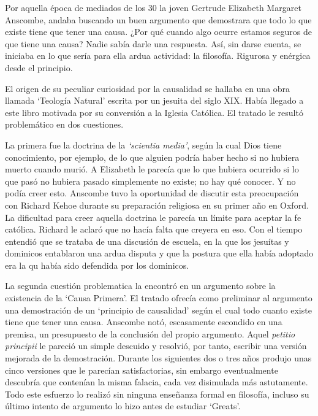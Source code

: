 
Por aquella época de mediados de los 30 la joven Gertrude Elizabeth Margaret Anscombe, andaba buscando un buen argumento que demostrara que todo lo que existe tiene que tener una causa. ¿Por qué cuando algo ocurre estamos seguros de que tiene una causa? Nadie sabía darle una respuesta.\autocite[cf.~][p.~vii ]{anscombe1981metaphysicsintro} Así, sin darse cuenta, se iniciaba en lo que sería para ella ardua actividad: la filosofía. Rigurosa y enérgica desde el principio.

El origen de su peculiar curiosidad por la causalidad se hallaba en una obra llamada `Teología Natural' escrita por un jesuita del siglo XIX. Había llegado a este libro motivada por su conversión a la Iglesia Católica.\autocite[cf.~][p.~vii]{anscombe1981metaphysicsintro} El tratado le resultó problemático en dos cuestiones.

La primera fue la doctrina de la \emph{`scientia media'}, según la cual Dios tiene conocimiento, por ejemplo, de lo que alguien podría haber hecho si no hubiera muerto cuando murió. A Elizabeth le parecía que lo que hubiera ocurrido si lo que pasó no hubiera pasado simplemente no existe; no hay qué conocer. Y no podía creer esto. Anscombe tuvo la oportunidad de discutir esta preocupación con Richard Kehoe durante su preparación religiosa en su primer año en Oxford. La dificultad para creer aquella doctrina le parecía un límite para aceptar la fe católica. Richard le aclaró que no hacía falta que creyera en eso. Con el tiempo entendió que se trataba de una discusión de escuela, en la que los jesuítas y dominicos entablaron una ardua disputa y que la postura que ella había adoptado era la qu había sido defendida por los dominicos.\autocite[cf.~][p.~vii]{anscombe1981metaphysicsintro}

La segunda cuestión problematica la encontró en un argumento sobre la existencia de la `Causa Primera'. El tratado ofrecía como preliminar al argumento una demostración de un `principio de causalidad' según el cual todo cuanto existe tiene que tener una causa. Anscombe notó, escasamente escondido en una premisa, un presupuesto de la conclusión del propio argumento. Aquel \emph{petitio principii} le pareció un simple descuido y resolvió, por tanto, escribir una versión mejorada de la demostración. Durante los siguientes dos o tres años produjo unas cinco versiones que le parecían satisfactorias, sin embargo eventualmente descubría que contenían la misma falacia, cada vez disimulada más astutamente. Todo este esfuerzo lo realizó sin ninguna enseñanza formal en filosofía, incluso su último intento de argumento lo hizo antes de estudiar `Greats'.\autocite[cf.~][p.~vii]{anscombe1981metaphysicsintro}

